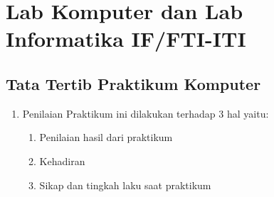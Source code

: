 \documentclass[../main.tex]{subfiles}
\begin{document}
\chapter*{Lab Komputer dan Lab Informatika IF/FTI-ITI}
\section*{Tata Tertib Praktikum Komputer}
\begin{enumerate}
\item Penilaian Praktikum ini dilakukan terhadap 3 hal yaitu:
  \begin{enumerate}
  \item Penilaian hasil dari praktikum
  \item Kehadiran
  \item Sikap dan tingkah laku saat praktikum
  \end{enumerate}


\end{enumerate}
\end{document}
